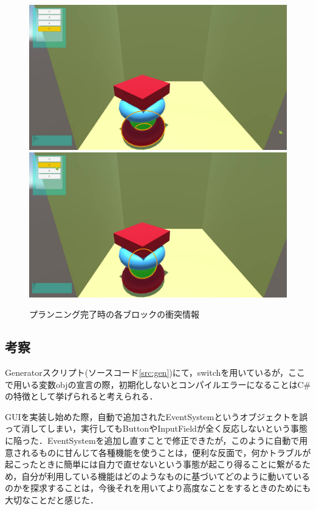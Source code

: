 \documentclass[12pt]{jarticle}
\begin{document}
\begin{figure}[!hbt]
  	\begin{center}
  		\includegraphics[scale=0.2]{images/BWP_Work6/bwp10.jpg}
  		\includegraphics[scale=0.2]{images/BWP_Work6/bwp11.jpg}
	\end{center}
  	\caption{プランニング完了時の各ブロックの衝突情報}
  	\label{fig:run7}
\end{figure}
\clearpage

\subsection{考察}
Generatorスクリプト(ソースコード\ref{src:gen})にて，switchを用いているが，ここで用いる変数objの宣言の際，初期化しないとコンパイルエラーになることはC\#の特徴として挙げられると考えられる．

GUIを実装し始めた際，自動で追加されたEventSystemというオブジェクトを誤って消してしまい，実行してもButtonやInputFieldが全く反応しないという事態に陥った．EventSystemを追加し直すことで修正できたが，このように自動で用意されるものに甘んじて各種機能を使うことは，便利な反面で，何かトラブルが起こったときに簡単には自力で直せないという事態が起こり得ることに繋がるため，自分が利用している機能はどのようなものに基づいてどのように動いているのかを探求することは，今後それを用いてより高度なことをするときのためにも大切なことだと感じた． \\
\end{document}
